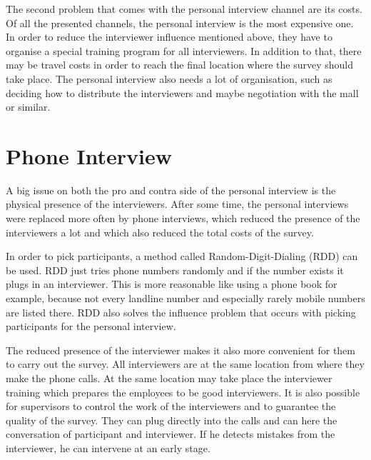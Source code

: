 \documentclass{report}
\begin{document}
The second problem that comes with the personal interview channel are its costs. Of all the presented channels, the personal interview is the most expensive one. In order to reduce the interviewer influence mentioned above, they have to organise a special training program for all interviewers. In addition to that, there may be travel costs in order to reach the final location where the survey should take place. The personal interview also needs a lot of organisation, such as deciding how to distribute the interviewers and maybe negotiation with the mall or similar.

\section{Phone Interview}

A big issue on both the pro and contra side of the personal interview is the physical presence of the interviewers. After some time, the personal interviews were replaced more often by phone interviews, which reduced the presence of the interviewers a lot and which also reduced the total costs of the survey.

In order to pick participants, a method called Random-Digit-Dialing (RDD) can be used. RDD just tries phone numbers randomly and if the number exists it plugs in an interviewer. This is more reasonable like using a phone book for example, because not every landline number and especially rarely mobile numbers are listed there. RDD also solves the influence problem that occurs with picking participants for the personal interview.

The reduced presence of the interviewer makes it also more convenient for them to carry out the survey. All interviewers are at the same location from where they make the phone calls. At the same location may take place the interviewer training which prepares the employees to be good interviewers. It is also possible for supervisors to control the work of the interviewers and to guarantee the quality of the survey. They can plug directly into the calls and can here the conversation of participant and interviewer. If he detects mistakes from the interviewer, he can intervene at an early stage.
\end{document}
